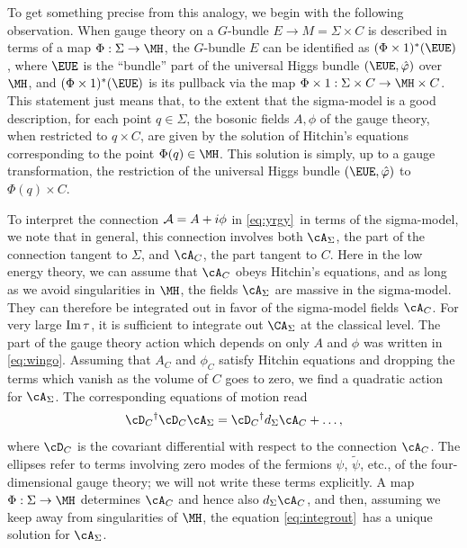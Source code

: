 To get something precise from this analogy, we begin with the
following observation. When gauge theory on a $G$-bundle $E\to
M=\Sigma\times C$ is described in terms of a map $\Phi:\Sigma\to
\MH$,  the $G$-bundle $E$  can be identified as $(\Phi\times
1)^*({\EUE})$, where ${\EUE}$ is the ``bundle'' part of the
universal Higgs bundle $({\EUE},\hat\varphi)$ over $\MH$, and
$(\Phi\times 1)^*({\EUE})$ is its pullback via the map $\Phi\times
1:\Sigma\times C\to \MH\times C$. This statement just means that,
to the extent that the sigma-model is a good description, for each
point $q\in \Sigma$, the bosonic fields $A,\phi$ of the gauge
theory, when restricted to $q\times C$, are given by the solution
of Hitchin's equations corresponding to the point $\Phi(q)\in
\MH$. This solution is simply, up to a gauge transformation, the
restriction of the universal Higgs bundle $({\EUE},\hat\varphi)$
to $\Phi(q)\times C$.

To interpret the connection ${\cal A}=A+i\phi$ in \eqref{eq:yrgy}\ in terms
of the sigma-model, we note that in general, this connection
involves both $\cA_\Sigma$, the part of  the connection tangent to
$\Sigma$, and $\cA_C$, the part tangent to $C$. Here in the low
energy theory, we can assume that $\cA_C$ obeys Hitchin's
equations, and as long as we avoid singularities in $\MH$, the
fields $\cA_\Sigma$ are massive in the sigma-model. They can
therefore be integrated out in favor of the sigma-model fields
$\cA_C$.  For very large ${\rm Im}\,\tau$,  it is sufficient to
integrate out $\CA_\Sigma$ at the classical level. The part of the
gauge theory action which depends on only $A$ and $\phi$ was
written in \eqref{eq:wingo}. Assuming that $A_C$ and $\phi_C$ satisfy
Hitchin equations and dropping the terms which vanish as the
volume of $C$ goes to zero, we find a quadratic action for
$\cA_\Sigma$. The corresponding equations of motion read
\setcounter{equation}{2}
\begin{equation}\label{eq:integrout}
\cD_C{}^\dagger \cD_C \cA_\Sigma=\cD_C{}^\dagger
d_\Sigma \cA_C+\dots,
\end{equation}
 where $\cD_C$ is the covariant differential
with respect to the connection $\cA_C$.  The ellipses refer to
terms involving zero modes of the fermions $\psi$, $\tilde\psi$,
etc., of the four-dimensional gauge theory; we will not write
these terms explicitly.   A map $\Phi:\Sigma\to \MH$   determines
$\cA_C$ and hence also $d_\Sigma\cA_C$, and then, assuming we keep
away from singularities of $\MH$, the equation \eqref{eq:integrout}\ has a
unique solution for $\cA_\Sigma$.

